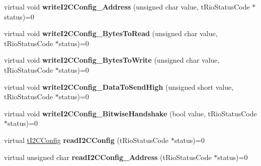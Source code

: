 \begin{DoxyCompactItemize}
\item 
\hypertarget{classnFPGA_1_1nFRC__2012__1__6__4_1_1tDIO_a7be2f8934e08b0424662d38c1979b01d}{
virtual void {\bfseries writeI2CConfig\_\-Address} (unsigned char value, tRioStatusCode $\ast$status)=0}
\label{classnFPGA_1_1nFRC__2012__1__6__4_1_1tDIO_a7be2f8934e08b0424662d38c1979b01d}

\item 
\hypertarget{classnFPGA_1_1nFRC__2012__1__6__4_1_1tDIO_ad0d55bda13ca89a5811a9fa2ae7d4d35}{
virtual void {\bfseries writeI2CConfig\_\-BytesToRead} (unsigned char value, tRioStatusCode $\ast$status)=0}
\label{classnFPGA_1_1nFRC__2012__1__6__4_1_1tDIO_ad0d55bda13ca89a5811a9fa2ae7d4d35}

\item 
\hypertarget{classnFPGA_1_1nFRC__2012__1__6__4_1_1tDIO_aa0c0ed019224a2018e4383074a39660c}{
virtual void {\bfseries writeI2CConfig\_\-BytesToWrite} (unsigned char value, tRioStatusCode $\ast$status)=0}
\label{classnFPGA_1_1nFRC__2012__1__6__4_1_1tDIO_aa0c0ed019224a2018e4383074a39660c}

\item 
\hypertarget{classnFPGA_1_1nFRC__2012__1__6__4_1_1tDIO_aeda44e1033a7a69acbf901578fcae758}{
virtual void {\bfseries writeI2CConfig\_\-DataToSendHigh} (unsigned short value, tRioStatusCode $\ast$status)=0}
\label{classnFPGA_1_1nFRC__2012__1__6__4_1_1tDIO_aeda44e1033a7a69acbf901578fcae758}

\item 
\hypertarget{classnFPGA_1_1nFRC__2012__1__6__4_1_1tDIO_ad2a69c25480a6ad3d72c24e933a2d9eb}{
virtual void {\bfseries writeI2CConfig\_\-BitwiseHandshake} (bool value, tRioStatusCode $\ast$status)=0}
\label{classnFPGA_1_1nFRC__2012__1__6__4_1_1tDIO_ad2a69c25480a6ad3d72c24e933a2d9eb}

\item 
\hypertarget{classnFPGA_1_1nFRC__2012__1__6__4_1_1tDIO_a6eac193d04247eb5e69ba7d5983058fe}{
virtual \hyperlink{unionnFPGA_1_1nFRC__2012__1__6__4_1_1tDIO_1_1tI2CConfig}{tI2CConfig} {\bfseries readI2CConfig} (tRioStatusCode $\ast$status)=0}
\label{classnFPGA_1_1nFRC__2012__1__6__4_1_1tDIO_a6eac193d04247eb5e69ba7d5983058fe}

\item 
\hypertarget{classnFPGA_1_1nFRC__2012__1__6__4_1_1tDIO_a04e1d2863a3ad9f065c7420102f4a433}{
virtual unsigned char {\bfseries readI2CConfig\_\-Address} (tRioStatusCode $\ast$status)=0}
\label{classnFPGA_1_1nFRC__2012__1__6__4_1_1tDIO_a04e1d2863a3ad9f065c7420102f4a433}


\end{DoxyCompactItemize}
